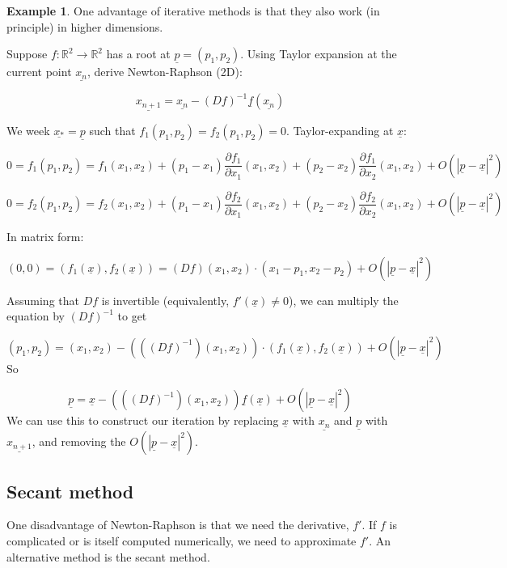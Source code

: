 \documentclass[12pt,a4paper]{article}
\theoremstyle{definition}
\newtheorem{example}[definition]{Example}
\begin{document}
\begin{example}
	One advantage of iterative methods is that they also work (in principle) in higher dimensions.

	Suppose $f: \mathbb{R}^2 \rightarrow \mathbb{R}^2$ has a root at $\underline{p} = (p_1, p_2)$. Using Taylor expansion at the current point $\underline{x_n}$, derive Newton-Raphson (2D):

	\[\underline{x_{n + 1}} = \underline{x_n} - (Df)^{-1} \underline{f}(\underline{x_n})\]

	We week $\underline{x_*} = \underline{p}$ such that $f_1(p_1, p_2) = f_2(p_1, p_2) = 0$. Taylor-expanding at $\underline{x}$:

	\[0 = f_1(p_1, p_2) = f_1(x_1, x_2) + (p_1 - x_1) \frac{\partial f_1}{\partial x_1} (x_1, x_2) + (p_2 - x_2) \frac{\partial f_1}{\partial x_2} (x_1, x_2) + O(|\underline{p} - \underline{x}|^2)\]

	\[0 = f_2(p_1, p_2) = f_2(x_1, x_2) + (p_1 - x_1) \frac{\partial f_2}{\partial x_1} (x_1, x_2) + (p_2 - x_2) \frac{\partial f_2}{\partial x_2} (x_1, x_2) + O(|\underline{p} - \underline{x}|^2)\]

	In matrix form:

	\[(0, 0) = (f_1(\underline{x}), f_2(\underline{x})) = (Df)(x_1, x_2) \cdot (x_1 - p_1, x_2 - p_2) + O(|\underline{p} - \underline{x}|^2)\]

	Assuming that $Df$ is invertible (equivalently, $f'(\underline{x}) \ne 0$), we can multiply the equation by $(Df)^{-1}$ to get

	\[ (p_1, p_2) = (x_1, x_2) - (((Df)^{-1})(x_1, x_2)) \cdot (f_1(\underline{x}), f_2(\underline{x})) + O(|\underline{p} - \underline{x}|^2)\] So
	
	\[\underline{p} = \underline{x} - (((Df)^{-1})(x_1, x_2)) \underline{f}(\underline{x}) + O(|\underline{p} - \underline{x}|^2) \] We can use this to construct our iteration by replacing $\underline{x}$ with $\underline{x_n}$ and $\underline{p}$ with $\underline{x_{n + 1}}$, and removing the $O(|\underline{p} - \underline{x}|^2)$.
\end{example}

\subsection{Secant method}

One disadvantage of Newton-Raphson is that we need the derivative, $f'$. If $f$ is complicated or is itself computed numerically, we need to approximate $f'$. An alternative method is the secant method.
\end{document}
